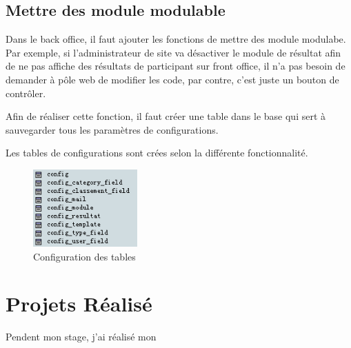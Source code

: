 \subsection{Mettre des module modulable}
Dans le back office, il faut ajouter les fonctions de mettre des module modulabe. Par exemple, si l'administrateur de site va désactiver le module de résultat afin de ne pas affiche des résultats de participant sur front office, il n'a pas besoin de demander à pôle web de modifier les code, par contre, c'est juste un bouton de contrôler. 

Afin de réaliser cette fonction, il faut créer une table dans le base qui sert à sauvegarder tous les paramètres de configurations.  

Les tables de configurations sont crées selon la différente fonctionnalité. 
\begin{figure}[hbtp]
\center
\includegraphics[width=4cm]{body/images/config.png}
\caption{Configuration des tables}
\end{figure}



 
	
\newpage
\section{Projets Réalisé}
Pendent mon stage,  j'ai réalisé mon 


